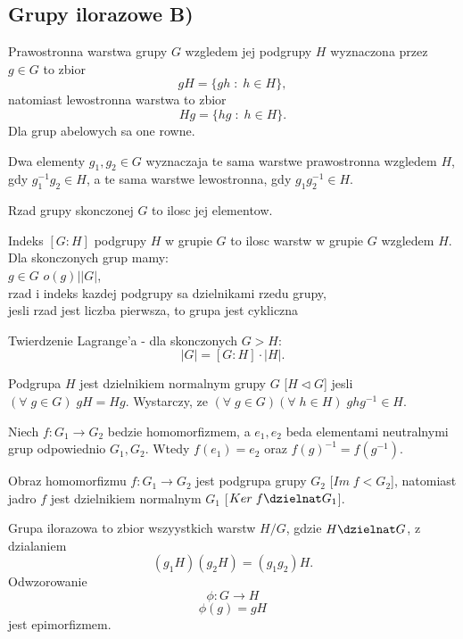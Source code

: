 \bigskip

\subsection{Grupy ilorazowe B)}
\begin{multicols*}{2}
    
    {\color{def}Prawostronna warstwa} grupy $G$ wzgledem jej podgrupy $H$ wyznaczona przez $g\in G$ to zbior
    $$gH=\{gh\;:\;h\in H\},$$
    natomiast {\color{acc}lewostronna} warstwa to zbior
    $$ Hg = \{hg\;:\;h\in H\}. $$
    Dla grup abelowych sa one rowne.\medskip

    Dwa elementy $g_1,g_2\in G$ wyznaczaja te sama warstwe prawostronna wzgledem $H$, gdy $g_1^{-1}g_2\in H$, a te sama warstwe lewostronna, gdy $g_1g_2^{-1}\in H$.\medskip

    \medskip

    {\color{def}Rzad grupy} skonczonej $G$ to ilosc jej elementow.\medskip

    {\color{def}Indeks} $[G : H]$ podgrupy $H$ w grupie $G$ to ilosc warstw w grupie $G$ wzgledem $H$. Dla skonczonych grup mamy:\smallskip\\
    \point $g\in G$ $o(g) | |G|$,\smallskip\\
    \point rzad i indeks kazdej podgrupy sa dzielnikami rzedu grupy,\smallskip\\
    \point jesli rzad jest liczba pierwsza, to grupa jest cykliczna\medskip

    {\color{def}Twierdzenie Lagrange'a} - dla skonczonych $G > H$:
    $$|G|=[G:H]\cdot |H|.$$

    \medskip

    Podgrupa $H$ jest {\color{def}dzielnikiem normalnym} grupy $G$ [$H\triangleleft G$] jesli $(\forall\;g\in G)\;gH=Hg$. Wystarczy, ze $(\forall\;g\in G)(\forall\;h\in H)\;ghg^{-1}\in H$.\medskip

    Niech $f:G_1\to G_2$ bedzie {\color{acc}homomorfizmem}, a $e_1, e_2$ beda elementami neutralnymi grup odpowiednio $G_1,G_2$. Wtedy $f(e_1)=e_2$ oraz $f(g)^{-1}=f(g^{-1})$.\medskip

    Obraz homomorfizmu $f:G_1\to G_2$ jest {\color{acc}podgrupa grupy $G_2$} [$Im\;f < G_2$], natomiast jadro $f$ jest {\color{acc}dzielnikiem normalnym $G_1$} [$Ker\;f \dzielnat G_1$].\medskip

    \medskip

    {\color{def}Grupa ilorazowa} to zbior wszyystkich warstw $H/G$, gdzie $H\dzielnat G$, z dzialaniem
    $$(g_1H)(g_2H)=(g_1g_2)H.$$
    Odwzorowanie 
    $$\phi:G\to H$$
    $$\phi(g)=gH$$
    jest {\color{acc}epimorfizmem}.

\end{multicols*}